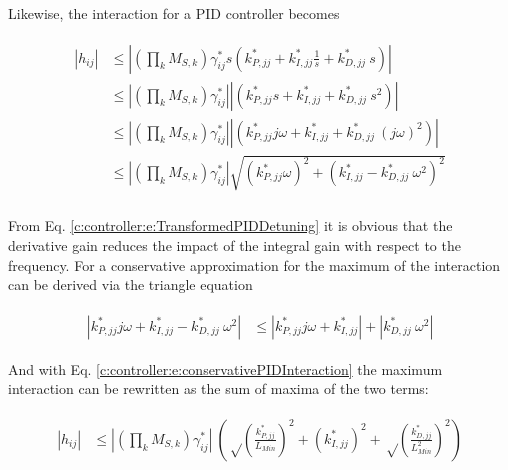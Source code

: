 {
Likewise, the interaction for a PID controller becomes

\begin{align}
\begin{split}
\left|h_{ij}\right| &\leq \left| \left(\prod_k M_{S,k} \right) \gamma_{ij}^* s \left(k_{P,jj}^* + k_{I,jj}^* \frac{1}{s} + k_{D,jj}^*~s \right) \right| \\
&\leq \left| \left(\prod_k M_{S,k} \right) \gamma_{ij}^*\right| \left|\left(k_{P,jj}^* s+ k_{I,jj}^*+ k_{D,jj}^*~s^2  \right) \right| \\
&\leq \left| \left(\prod_k M_{S,k} \right) \gamma_{ij}^*\right| \left|\left(k_{P,jj}^* j\omega+ k_{I,jj}^*+ k_{D,jj}^*~(j\omega)^2  \right) \right| \\
&\leq \left| \left(\prod_k M_{S,k} \right) \gamma_{ij}^*\right| \sqrt{\left(k_{P,jj}^*\omega\right)^2+ \left(k_{I,jj}^*- k_{D,jj}^*~\omega^2\right)^2} \\
\end{split}
\label{c:controller:e:TransformedPIDDetuning}
\end{align}
}

From Eq. \ref{c:controller:e:TransformedPIDDetuning} it is obvious that the derivative gain reduces the impact of the integral gain with respect to the frequency.
For a conservative approximation for the maximum of the interaction can be derived via the triangle equation

\begin{align}
\begin{split}
\left|k_{P,jj}^* j \omega+ k_{I,jj}^*- k_{D,jj}^*~\omega^2   \right| & \leq \left|k_{P,jj}^* j \omega+ k_{I,jj}^*\right| + \left| k_{D,jj}^*~\omega^2   \right|
\end{split}
\label{c:controller:e:conservativePIDInteraction}
\end{align}

And with Eq. \ref{c:controller:e:conservativePIDInteraction} the maximum interaction can be rewritten as the sum of maxima of the two terms:

\begin{align}
\begin{split}
\left|h_{ij}\right| &\leq \left| \left(\prod_k M_{S,k} \right) \gamma_{ij}^*\right|~  \left( {\sqrt\left(\frac{k_{P,jj}^*}{L_{Min}}\right)^2 + \left( k_{I,jj}^* \right)^2}   + {\sqrt\left( \frac{k_{D,jj}^*}{L_{Min}^2} \right)^2}  \right)    
\end{split}
\label{c:controller:conservativePIDTuning}
\end{align}

